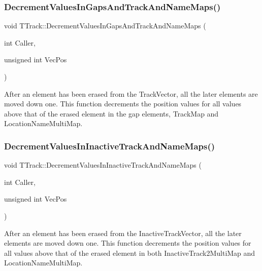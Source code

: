\subsubsection{\texorpdfstring{Decrement\+Values\+In\+Gaps\+And\+Track\+And\+Name\+Maps()}{DecrementValuesInGapsAndTrackAndNameMaps()}}
{\footnotesize\ttfamily void T\+Track\+::\+Decrement\+Values\+In\+Gaps\+And\+Track\+And\+Name\+Maps (\begin{DoxyParamCaption}\item[{int}]{Caller,  }\item[{unsigned int}]{Vec\+Pos }\end{DoxyParamCaption})}

After an element has been erased from the Track\+Vector, all the later elements are moved down one. This function decrements the position values for all values above that of the erased element in the gap elements, Track\+Map and Location\+Name\+Multi\+Map. \mbox{\label{class_t_track_af8f925ac5e7301c1094cec76808e1140}} 
\subsubsection{\texorpdfstring{Decrement\+Values\+In\+Inactive\+Track\+And\+Name\+Maps()}{DecrementValuesInInactiveTrackAndNameMaps()}}
{\footnotesize\ttfamily void T\+Track\+::\+Decrement\+Values\+In\+Inactive\+Track\+And\+Name\+Maps (\begin{DoxyParamCaption}\item[{int}]{Caller,  }\item[{unsigned int}]{Vec\+Pos }\end{DoxyParamCaption})}

After an element has been erased from the Inactive\+Track\+Vector, all the later elements are moved down one. This function decrements the position values for all values above that of the erased element in both Inactive\+Track2\+Multi\+Map and Location\+Name\+Multi\+Map. \mbox{\label{class_t_track_a3b4a2e8a16c61a4286fcf34adb000819}} 
